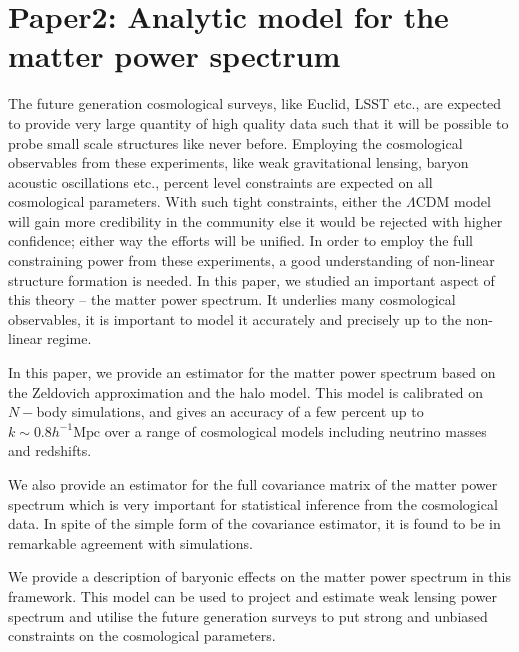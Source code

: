\chapter{Paper2: Analytic model for the matter power spectrum}\label{paper:analyticmodel}

The future generation cosmological surveys, like Euclid, 
LSST etc., are expected to provide
very large quantity of high quality data such that it will be 
possible to probe small scale structures like never before. Employing 
the cosmological observables from these experiments,
like weak gravitational lensing, baryon acoustic oscillations etc., 
percent level constraints are expected on all cosmological 
parameters. With such tight
constraints, either the $\Lambda$CDM model will gain more credibility
in the community else it would be rejected with higher confidence; either 
way the efforts will be unified. 
In order to employ the full constraining power from these experiments, a good
understanding of non-linear structure formation is needed.
In this paper, we studied an important aspect of this theory -- 
the matter power spectrum. It underlies
many cosmological observables, it is important
to model it accurately and precisely up to the non-linear regime. 

In this paper, we provide an estimator for the matter
power spectrum based on the Zeldovich approximation and the halo model. 
This model is calibrated on $N-$body simulations, and gives
an accuracy of a few percent up to $k\sim 0.8 h^{-1}\mathrm{Mpc}$ 
over a range of cosmological models 
including neutrino masses and redshifts. 

We also provide an estimator for the full covariance matrix of the matter power
spectrum which is very important for statistical inference from the cosmological
data. In spite of the simple form of the covariance estimator, it is found
to be in remarkable agreement with simulations. 

We provide a description of baryonic effects on the matter
power spectrum in this framework. This model can be used to project and estimate
weak lensing power spectrum and utilise the future generation surveys
to put strong and unbiased constraints on the cosmological parameters.

